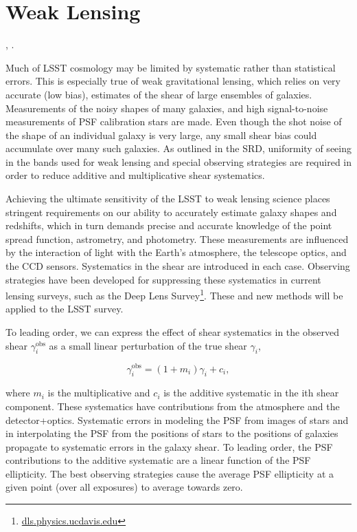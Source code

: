 %
%

\newcommand{\red}[1]{\textcolor{red}{#1}}

\clearpage
\section{Weak Lensing}
\def\secname{wl}\label{sec:\secname}

,
.

Much of LSST cosmology may be limited by systematic rather than statistical
errors.  This is especially true of weak gravitational lensing, which relies on
very accurate (\ie low bias), estimates of the shear of large ensembles of
galaxies. Measurements of the noisy shapes of many galaxies, and high
signal-to-noise measurements of PSF calibration stars are made.   Even though
the shot noise of the shape of an individual galaxy is very large, any small
shear bias could accumulate over many such galaxies.  As outlined in the SRD,
uniformity of seeing in the bands used for weak lensing and special observing
strategies are required in order to reduce additive and multiplicative shear
systematics.

Achieving the ultimate sensitivity of the LSST to weak lensing science places
stringent requirements on our ability to accurately estimate galaxy shapes and
redshifts, which in turn demands precise and accurate knowledge of the point
spread function, astrometry, and photometry.  These measurements are influenced
by the interaction of light with the Earth's atmosphere, the telescope optics,
and the CCD sensors.  Systematics in the shear are introduced in each case.
Observing strategies have been developed for suppressing these systematics in
current lensing surveys, such as the Deep Lens
Survey\footnote{\url{dls.physics.ucdavis.edu}}.  These and new methods will be
applied to the LSST survey.

To leading order, we can express the effect of shear systematics in the observed
shear $\gamma^\mathrm{obs}_i$ as a small linear perturbation of the true shear
$\gamma_i$,

$$ \gamma_i^\mathrm{obs} = (1+m_i) \gamma_i + c_i, $$

where $m_i$ is the multiplicative and $c_i$ is the additive systematic in the
ith shear component.  These systematics have contributions from the atmosphere
and the detector+optics.  Systematic errors in modeling the PSF from images of
stars and in interpolating the PSF from the positions of stars to the positions of
galaxies propagate to systematic errors in the galaxy shear.  To leading order, the
PSF contributions to the additive systematic are a linear function of the PSF
ellipticity.  The best observing strategies cause the average PSF ellipticity at a
given point (over all exposures) to average towards zero.

